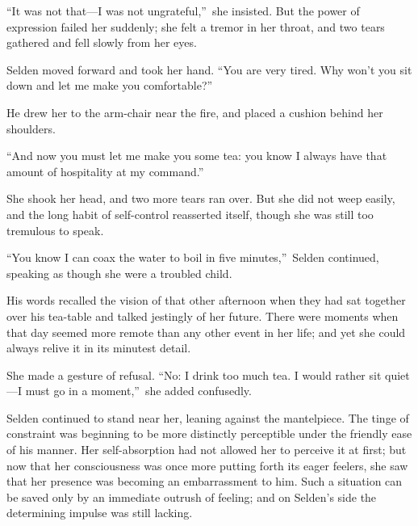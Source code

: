 \documentclass[12pt,a4paper]{book}
\begin{document}
``It was not that---I was not ungrateful,''\ she insisted. But the
power of expression failed her suddenly; she felt a tremor in her
throat, and two tears gathered and fell slowly from her eyes.





Selden moved forward and took her hand. ``You are very tired. Why
won't you sit down and let me make you comfortable?''





He drew her to the arm-chair near the fire, and placed a cushion
behind her shoulders.





``And now you must let me make you some tea: you know I always
have that amount of hospitality at my command.''





She shook her head, and two more tears ran over. But she did not
weep easily, and the long habit of self-control reasserted
itself, though she was still too tremulous to speak.





``You know I can coax the water to boil in five minutes,''\ Selden
continued, speaking as though she were a troubled child.





His words recalled the vision of that other afternoon
when they had sat together over his tea-table and talked
jestingly of her future. There were moments when that day seemed
more remote than any other event in her life; and yet she could
always relive it in its minutest detail.





She made a gesture of refusal. ``No: I drink too much tea. I would
rather sit quiet---I must go in a moment,''\ she added confusedly.





Selden continued to stand near her, leaning against the
mantelpiece. The tinge of constraint was beginning to be more
distinctly perceptible under the friendly ease of his manner. Her
self-absorption had not allowed her to perceive it at first; but
now that her consciousness was once more putting forth its eager
feelers, she saw that her presence was becoming an embarrassment
to him. Such a situation can be saved only by an immediate
outrush of feeling; and on Selden's side the determining impulse
was still lacking.
\end{document}
